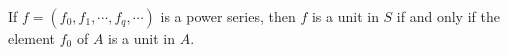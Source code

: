 If $f = (f_0, f_1, \cdots, f_q, \cdots)$ is a power series, then $f$ is a unit in $S$ if and only if the element $f_0$ of $A$ is a unit in $A$.